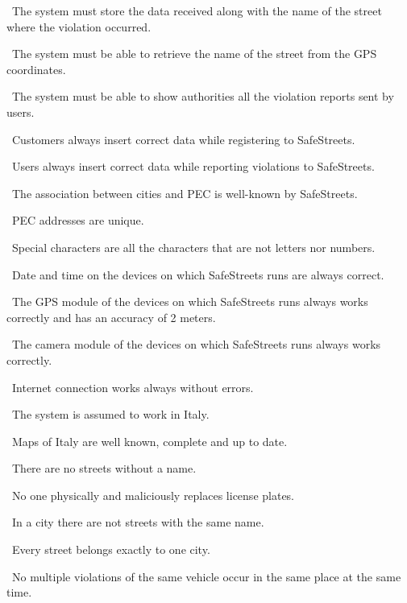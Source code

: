 \begin{description}
\begin{description}
					\item {}\ The system must store the data received along with the name of the street where the violation occurred.
					\item {}\ The system must be able to retrieve the name of the street from the GPS coordinates.
					\item {}\ The system must be able to show authorities all the violation reports sent by users.
					\item {}\ Customers always insert correct data while registering to SafeStreets.
					\item {}\ Users always insert correct data while reporting violations to SafeStreets.
					\item {}\ The association between cities and PEC is well-known by SafeStreets.
					\item {}\ PEC addresses are unique.
					\item {}\ Special characters are all the characters that are not letters nor numbers.
					\item {}\ Date and time on the devices on which SafeStreets runs are always correct.
					\item {}\ The GPS module of the devices on which SafeStreets runs always works correctly and has an accuracy of 2 meters.
					\item {}\ The camera module of the devices on which SafeStreets runs always works correctly.
					\item {}\ Internet connection works always without errors.
					\item {}\ The system is assumed to work in Italy.
					\item {}\ Maps of Italy are well known, complete and up to date.
					\item {}\ There are no streets without a name.
					\item {}\ No one physically and maliciously replaces license plates.
					\item {}\ In a city there are not streets with the same name.
					\item {}\ Every street belongs exactly to one city.
					\item {}\ No multiple violations of the same vehicle occur in the same place at the same time.
				\end{description}
					

\end{description}
